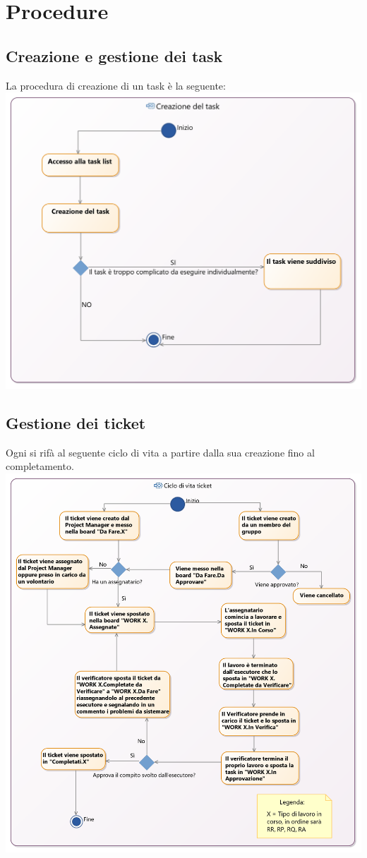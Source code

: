 \documentclass[NormeDiProgetto.tex]{subfiles}
\begin{document}
	\section{Procedure}
	\subsection{Creazione e gestione dei task}	
	La procedura di creazione di un task è la seguente: \\
	\includegraphics[scale=0.3]{../../common/images/TaskCreation}		
	
	\subsection{Gestione dei ticket}
	 Ogni  si rifà al seguente ciclo di vita a partire dalla sua creazione fino al completamento.\\
	\includegraphics[scale=0.3]{../../common/images/AsanaFlow}
	
\end{document}
